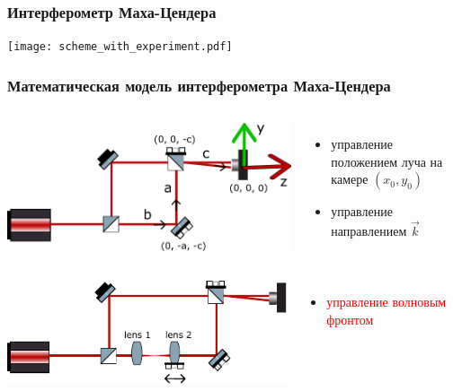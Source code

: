 \begin{frame}
\frametitle{Интерферометр Маха-Цендера}
  \centering
  \texttt{[image: scheme\_with\_experiment.pdf]}
\end{frame}


\begin{frame}
\frametitle{Математическая модель интерферометра Маха-Цендера}
\begin{minipage}{\textwidth}
\begin{columns}
  \centering
  \includegraphics[width=1\linewidth]{Presentation/images/MZI_matmodel_v2.png}
  
\begin{itemize}
    \item управление положением луча на камере $(x_0, y_0)$
    \item управление направлением $\vec{k}$
  \end{itemize}
\end{columns}
\end{minipage}

\vspace{20pt}

\begin{minipage}{\textwidth}
\begin{columns}
  \centering
  \includegraphics[width=1\linewidth]{images/MZI_expl_lenses.pdf}
  
\begin{itemize}
    \item \textcolor{red}{управление волновым фронтом}
  \end{itemize}
\end{columns}
\end{minipage}
\end{frame}


